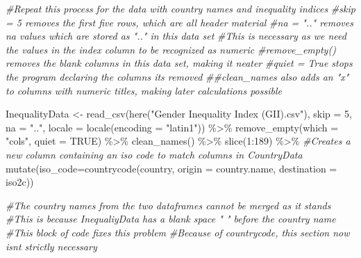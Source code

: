 \documentclass[
]{article}
\newenvironment{Shaded}{\begin{snugshade}}{\end{snugshade}}
\newcommand{\AttributeTok}[1]{\textcolor[rgb]{0.77,0.63,0.00}{#1}}
\newcommand{\CommentTok}[1]{\textcolor[rgb]{0.56,0.35,0.01}{\textit{#1}}}
\newcommand{\ConstantTok}[1]{\textcolor[rgb]{0.00,0.00,0.00}{#1}}
\newcommand{\DecValTok}[1]{\textcolor[rgb]{0.00,0.00,0.81}{#1}}
\newcommand{\FunctionTok}[1]{\textcolor[rgb]{0.00,0.00,0.00}{#1}}
\newcommand{\NormalTok}[1]{#1}
\newcommand{\OtherTok}[1]{\textcolor[rgb]{0.56,0.35,0.01}{#1}}
\newcommand{\SpecialCharTok}[1]{\textcolor[rgb]{0.00,0.00,0.00}{#1}}
\newcommand{\StringTok}[1]{\textcolor[rgb]{0.31,0.60,0.02}{#1}}
\begin{document}
\begin{Shaded}
\begin{Highlighting}[]
\CommentTok{\#Repeat this process for the data with country names and inequality indices }
\CommentTok{\#\textquotesingle{}skip = 5\textquotesingle{} removes the first five rows, which are all header material}
\CommentTok{\#\textquotesingle{}na = ".." removes na values which are stored as ".." in this data set}
\CommentTok{\#This is necessary as we need the values in the index column to be recognized as numeric}
\CommentTok{\#remove\_empty() removes the blank columns in this data set, making it neater}
\CommentTok{\#\textquotesingle{}quiet = True\textquotesingle{} stops the program declaring the columns it\textquotesingle{}s removed}
\CommentTok{\#\textquotesingle{}\#clean\_names also adds an "x" to columns with numeric titles, making later calculations possible}

\NormalTok{InequalityData }\OtherTok{\textless{}{-}} \FunctionTok{read\_csv}\NormalTok{(}\FunctionTok{here}\NormalTok{(}\StringTok{"Gender Inequality Index (GII).csv"}\NormalTok{),}
                           \AttributeTok{skip =} \DecValTok{5}\NormalTok{, }\AttributeTok{na =} \StringTok{".."}\NormalTok{,}
                           \AttributeTok{locale =} \FunctionTok{locale}\NormalTok{(}\AttributeTok{encoding =} \StringTok{"latin1"}\NormalTok{)) }\SpecialCharTok{\%\textgreater{}\%}
  \FunctionTok{remove\_empty}\NormalTok{(}\AttributeTok{which =} \StringTok{"cols"}\NormalTok{, }\AttributeTok{quiet =} \ConstantTok{TRUE}\NormalTok{) }\SpecialCharTok{\%\textgreater{}\%}
  \FunctionTok{clean\_names}\NormalTok{() }\SpecialCharTok{\%\textgreater{}\%}
  \FunctionTok{slice}\NormalTok{(}\DecValTok{1}\SpecialCharTok{:}\DecValTok{189}\NormalTok{) }\SpecialCharTok{\%\textgreater{}\%}
  \CommentTok{\#Creates a new column containing an iso code to match columns in CountryData}
  \FunctionTok{mutate}\NormalTok{(}\AttributeTok{iso\_code=}\FunctionTok{countrycode}\NormalTok{(country, }\AttributeTok{origin =} \StringTok{\textquotesingle{}country.name\textquotesingle{}}\NormalTok{, }\AttributeTok{destination =} \StringTok{\textquotesingle{}iso2c\textquotesingle{}}\NormalTok{))}

\CommentTok{\#The country names from the two dataframes cannot be merged as it stands}
\CommentTok{\#This is because InequaliyData has a blank space " " before the country name}
\CommentTok{\#This block of code fixes this problem}
\CommentTok{\#Because of countrycode, this section now isn\textquotesingle{}t strictly necessary}


\end{Highlighting}
\end{Shaded}
\end{document}
